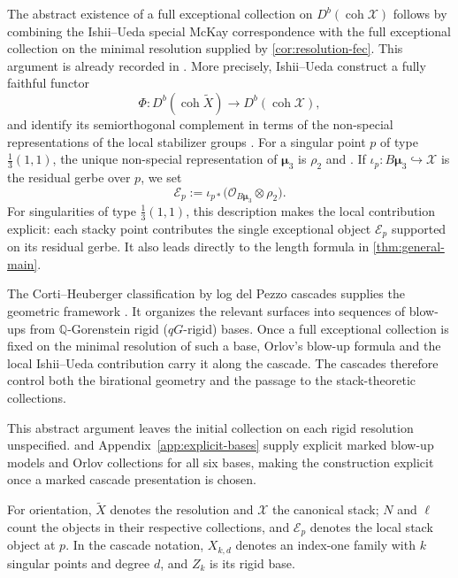 \documentclass[11pt]{article}
\theoremstyle{plain}
\theoremstyle{definition}
\theoremstyle{remark}
\newcommand{\Db}{D^b}
\newcommand{\coh}{\operatorname{coh}}
\newcommand{\XX}{\mathcal X}
\newcommand{\muthree}{\boldsymbol{\mu}_3}
\newcommand{\OO}{\mathcal O}
\begin{document}
The abstract existence of a full exceptional collection on \(\Db(\coh\XX)\) follows by combining the Ishii--Ueda special McKay correspondence \cite[Theorem~1.4]{Ishii2015} with the full exceptional collection on the minimal resolution supplied by \cref{cor:resolution-fec}. This argument is already recorded in \cite[Remark~4.8]{GugiattiRota2023}. More precisely, Ishii--Ueda construct a fully faithful functor
\[
\Phi:\Db(\coh\widetilde X)\longrightarrow \Db(\coh\XX),
\]
and identify its semiorthogonal complement in terms of the non-special representations of the local stabilizer groups \cite[Proposition~1.1 and Theorem~1.2]{Ishii2015}. For a singular point \(p\) of type \(\frac13(1,1)\), the unique non-special representation of \(\muthree\) is \(\rho_2\) \cite[Theorem~3.2]{Ishii2015} and \cite[Example~2.6]{GugiattiRota2023}. If \(\iota_p:B\muthree\hookrightarrow\XX\) is the residual gerbe over \(p\), we set
\[
\mathcal E_p:=\iota_{p*}\bigl(\OO_{B\muthree}\otimes\rho_2\bigr).
\]
For singularities of type \(\frac13(1,1)\), this description makes the local contribution explicit: each stacky point contributes the single exceptional object \(\mathcal E_p\) supported on its residual gerbe. It also leads directly to the length formula in \cref{thm:general-main}.

The Corti--Heuberger classification by log del Pezzo cascades supplies the geometric framework \cite{Corti2016}. It organizes the relevant surfaces into sequences of blow-ups from \(\mathbb Q\)-Gorenstein rigid (\(qG\)-rigid) bases. Once a full exceptional collection is fixed on the minimal resolution of such a base, Orlov's blow-up formula and the local Ishii--Ueda contribution carry it along the cascade. The cascades therefore control both the birational geometry and the passage to the stack-theoretic collections.

This abstract argument leaves the initial collection on each rigid
resolution unspecified.  and
Appendix~\ref{app:explicit-bases} supply explicit marked blow-up models
and Orlov collections for all six bases, making the construction explicit
once a marked cascade presentation is chosen.

For orientation, \(\widetilde X\) denotes the resolution and \(\XX\)
the canonical stack; \(N\) and \(\ell\) count the objects in their
respective collections, and \(\mathcal E_p\) denotes the local stack
object at \(p\). In the cascade notation, \(X_{k,d}\) denotes an
index-one family with \(k\) singular points and degree \(d\), and
\(Z_k\) is its rigid base.
\end{document}
